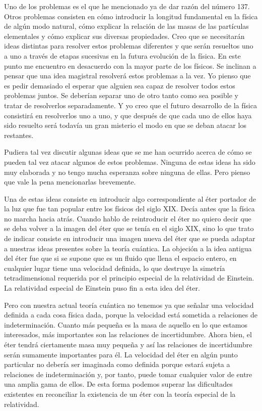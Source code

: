 \documentclass[a4paper, 12pt]{article}
\begin{document}
Uno de los problemas es el que he mencionado ya de dar razón del número 137. Otros problemas consisten en cómo introducir la longitud fundamental en la física de algún modo natural, cómo explicar la relación de las masas de las partículas elementales y cómo explicar sus diversas propiedades. Creo que se necesitarán ideas distintas para resolver estos problemas diferentes y que serán resueltos uno a uno a través de etapas sucesivas en la futura evolución de la física. En este punto me encuentro en desacuerdo con la mayor parte de los físicos. Se inclinan a pensar que una idea magistral resolverá estos problemas a la vez. Yo pienso que es pedir demasiado el esperar que alguien sea capaz de resolver todos estos problemas juntos. Se deberían separar uno de otro tanto como sea posible y tratar de resolverlos separadamente. Y yo creo que el futuro desarrollo de la física consistirá en resolverlos uno a uno, y que después de que cada uno de ellos haya sido resuelto será todavía un gran misterio el modo en que se deban atacar los restantes.

Pudiera tal vez discutir algunas ideas que se me han ocurrido acerca de cómo se pueden tal vez atacar algunos de estos problemas. Ninguna de estas ideas ha sido muy elaborada y no tengo mucha esperanza sobre ninguna de ellas. Pero pienso que vale la pena mencionarlas brevemente.

Una de estas ideas consiste en introducir algo correspondiente al éter portador de la luz que fue tan popular entre los físicos del siglo XIX. Decía antes que la física no marcha hacia atrás. Cuando hablo de reintroducir el éter no quiero decir que se deba volver a la imagen del éter que se tenía en el siglo XIX, sino lo que trato de indicar consiste en introducir una imagen nueva del éter que se pueda adaptar a nuestras ideas presentes sobre la teoría cuántica. La objeción a la idea antigua del éter fue que si se supone que es un fluido que llena el espacio entero, en cualquier lugar tiene una velocidad definida, lo que destruye la simetría tetradimensional requerida por el principio especial de la relatividad de Einstein. La relatividad especial de Einstein puso fin a esta idea del éter. 

 Pero con nuestra actual teoría cuántica no tenemos ya que señalar una velocidad definida a cada cosa física dada, porque la velocidad está sometida a relaciones de indeterminación. Cuanto más pequeña es la masa de aquello en lo que estamos interesados, más importantes son las relaciones de incertidumbre. Ahora bien, el éter tendrá ciertamente masa muy pequeña y así las relaciones de incertidumbre serán sumamente importantes para él. La velocidad del éter en algún punto particular no debería ser imaginada como definida porque estará sujeta a relaciones de indeterminación y, por tanto, puede tomar cualquier valor de entre una amplia gama de ellos. De esta forma podemos superar las dificultades existentes en reconciliar la existencia de un éter con la teoría especial de la relatividad.
\end{document}

